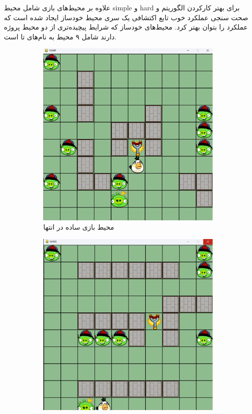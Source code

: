 \documentclass[11pt, a4paper, oneside]{article}
\begin{document}
علاوه بر محیط‌های بازی شامل محیط simple و hard برای بهتر کارکردن الگوریتم و صحت سنجی عملکرد خوب تابع اکتشافی یک سری محیط خودساز ایجاد شده است که عملکرد را بتوان بهتر کرد.
محیط‌های خودساز که شرایط پیچیده‌تری از دو محیط پروژه دارند شامل ۹ محیط به نام‌های
 تا
   است.
   
   \begin{figure}[H]
   	\begin{subfigure}{0.35\textwidth}
   		\includegraphics[width=\textwidth]{./images/game_simple}
   		\caption{محیط بازی ساده در انتها}
   		\label{fig:a}
   	\end{subfigure}
   	\hfill
   	\begin{subfigure}{0.35\textwidth}
   		\includegraphics[width=\textwidth]{./images/game_hard}

\end{subfigure}
\end{figure}
\end{document}
